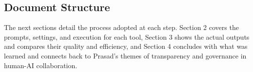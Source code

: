\subsection{Document Structure}

The next sections detail the process adopted at
each step. Section 2 covers the prompts,
settings, and execution for each tool, Section
3 shows the actual outputs and compares their
quality and efficiency, and Section 4 concludes
with what was learned and connects back to
Prasad's themes of transparency and governance
in human-AI collaboration.


